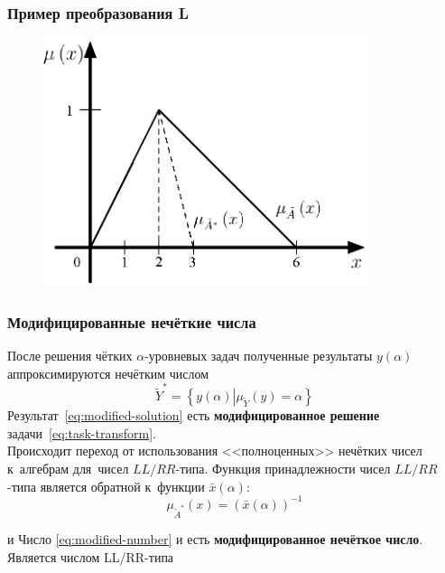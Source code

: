 \documentclass[12pt]{beamer}
\begin{document}
\begin{frame}
  \frametitle{Пример преобразования L}
  \begin{figure}
    \center
    \includegraphics[width=0.85\textwidth]{sample-224}
  \end{figure}
\end{frame}


\begin{frame}
  \frametitle{Модифицированные нечёткие числа}
  После решения чётких $\alpha $-уровневых задач полученные результаты $y\left( \alpha  \right)$ аппроксимируются нечётким числом 
  \begin{equation}
    \label{eq:modified-solution}
    \tilde Y^{*}=\left\{ y(\alpha )\left| \mu_{\tilde Y}(y)=\alpha \right. \right\}  
  \end{equation}
  Результат~\eqref{eq:modified-solution} есть \textbf{модифицированное решение} задачи~\eqref{eq:task-transform}.\\
Происходит переход от использования <<полноценных>> нечётких чисел к~алгебрам для~чисел $LL/RR$-типа. Функция принадлежности чисел $LL/RR$-типа является обратной к~функции $\bar{x}\left(\alpha \right)$:
\begin{equation}
  \label{eq:modified-number}
  \mu_{\tilde A^{*}}\left( x \right)={\left( \bar{x}\left( \alpha  \right) \right)}^{-1}
\end{equation}

и Число \eqref{eq:modified-number} и есть \textbf{модифицированное нечёткое число}. Является числом LL/RR-типа
\end{frame}
\end{document}
